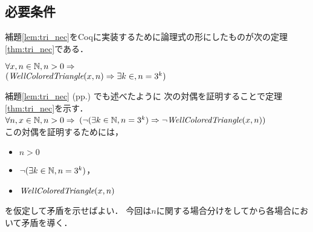 
\subsection{必要条件} \label{sec:nec}
補題\ref{lem:tri_nec}をCoqに実装するために論理式の形にしたものが次の定理\ref{thm:tri_nec}である．
\begin{thm}[必要条件] %
  $\forall x, n \in \mathbb{N}, n > 0 \Rightarrow$ \\
  $(\textit{WellColoredTriangle}(x,n) \Rightarrow \exists k \in , n = 3^k)$ 
\end{thm}
補題\ref{lem:tri_nec} (pp.\pageref{lem:tri_nec}) でも述べたように
次の対偶を証明することで定理\ref{thm:tri_nec}を示す．\\
$\forall n, x \in \mathbb{N}, n > 0 \Rightarrow$
$(\lnot(\exists k \in \mathbb{N}, n = 3 ^ k) \Rightarrow \lnot\textit{WellColoredTriangle}(x,n))$ \\
この対偶を証明するためには，
\begin{itemize}
\item
  $n > 0$
\item
  $\lnot(\exists k \in \mathbb{N}, n = 3 ^ k)$，
\item
  $\textit{WellColoredTriangle}(x,n)$
\end{itemize}
を仮定して矛盾を示せばよい．
今回は$n$に関する場合分けをしてから各場合において矛盾を導く．
